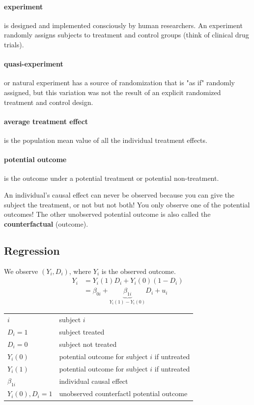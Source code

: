 \documentclass[a3paper, 8pt]{extarticle}
\begin{document}
\begin{multicols*}{5}
\paragraph{experiment} is designed and implemented consciously by human researchers. An experiment randomly assigns subjects to treatment and control groups (think of clinical drug trials).

\paragraph{quasi-experiment} or natural experiment has a source of randomization that is "as if" randomly assigned, but this variation was not the result of an explicit randomized treatment and control design.

\paragraph{average treatment effect} is the population mean value of all the individual treatment effects.

\paragraph{potential outcome} is the outcome under a potential treatment or potential non-treatment.

An individual's causal effect can never be observed because you can give the subject the treatment, or not but not both!
You only observe one of the potential outcomes!
The other unobserved potential outcome is also called the \textbf{counterfactual} (outcome).

\subsection{Regression}

We observe $(Y_i, D_i)$, where $Y_i$ is the observed outcome.
\begin{align*}
    Y_i&=Y_i(1)D_i + Y_i(0)(1-D_i)\\
    &=\beta_{0i} + \underbrace{\beta_{1i}}_{Y_i (1) - Y_i (0)} D_i + u_i
\end{align*}
\begin{tabular}{l l}
    $i$ & subject $i$ \\
    $D_i=1$ & subject treated \\
    $D_i=0$ & subject not treated \\
    $Y_i(0)$ & potential outcome for subject $i$ if untreated \\
    $Y_i(1)$ & potential outcome for subject $i$ if untreated \\
    $\beta_{1i}$ & individual causal effect \\
    $Y_i (0), D_i =1$ & unobserved counterfactl potential outcome
\end{tabular}


\end{multicols*}
\end{document}
